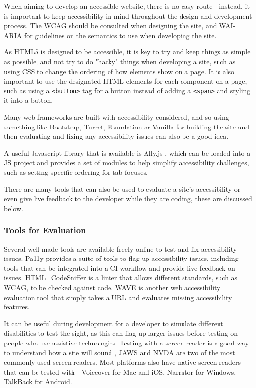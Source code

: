 \documentclass[ %
                    author={Aleena Baig},
                supervisor={Dr Simon Lock},
                    degree={BSc},
                     title={On Making Web Accessible Graphs},
                  subtitle={},
                      year={2019} ]{dissertation}
\begin{document}
When aiming to develop an accessible website, there is no easy route - instead, it is important to keep accessibility in mind throughout the design and development process. The WCAG should be consulted when designing the site, and WAI-ARIA for guidelines on the semantics to use when developing the site. 

As HTML5 is designed to be accessible, it is key to try and keep things as simple as possible, and not try to do "hacky" things when developing a site, such as using CSS to change the ordering of how elements show on a page. It is also important to use the designated HTML elements for each component on a page, such as using a \texttt{<button>} tag for a button instead of adding a \texttt{<span>} and styling it into a button.

Many web frameworks are built with accessibility considered, and so using something like Bootstrap, Turret, Foundation or Vanilla for building the site and then evaluating and fixing any accessibility issues can also be a good idea.

A useful Javascript library that is available is Ally.js \cite{allyjs}, which can be loaded into a JS project and provides a set of modules to help simplify accessibility challenges, such as setting specific ordering for tab focuses.

There are many tools that can also be used to evaluate a site's accessibility or even give live feedback to the developer while they are coding, these are discussed below.

\subsubsection{Tools for Evaluation}

Several well-made tools are available freely online to test and fix accessibility issues. Pa11y \cite{pa11y} provides a suite of tools to flag up accessibility issues, including tools that can be integrated into a CI workflow and provide live feedback on issues. HTML\_CodeSniffer \cite{codesniffer} is a linter that allows different standards, such as WCAG, to be checked against code. WAVE \cite{wave} is another web accessibility evaluation tool that simply takes a URL and evaluates missing accessibility features.

It can be useful during development for a developer to simulate different disabilities to test the sight, as this can flag up larger issues before testing on people who use assistive technologies. Testing with a screen reader is a good way to understand how a site will sound , JAWS and NVDA are two of the most commonly-used screen readers. Most platforms also have native screen-readers that can be tested with - Voiceover for Mac and iOS, Narrator for Windows, TalkBack for Android. 
\end{document}
